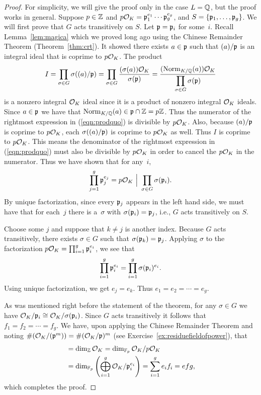 \begin{proof}
	For simplicity, we will give the proof only in the case $L=\mathbb{Q}$, but
	the proof works in general.  Suppose $p\in\mathbb{Z}$ and
	$p\mathcal{O}_K=\mathfrak{p}_1^{e_1}\cdots \mathfrak{p}_g^{e_g}$, and $S=\{\mathfrak{p}_1,\ldots, \mathfrak{p}_g\}$.  We
	will first prove that $G$ acts transitively on $S$.  Let $\mathfrak{p}=\mathfrak{p}_i$ for
	some~$i$.   Recall Lemma~\ref{lem:magica} which we proved long ago using the
	Chinese Remainder Theorem (Theorem~\ref{thm:crt}). It showed there exists
	$a\in\mathfrak{p}$ such that $(a)/\mathfrak{p}$ is an integral ideal that is
	coprime to $p\mathcal{O}_K$.   The product
	\begin{equation}\label{eqn:prodquo}
		I= \prod_{\sigma\in G} \sigma((a)/\mathfrak{p})
		= \prod_{\sigma\in G} \frac{(\sigma(a))\mathcal{O}_K}{\sigma(\mathfrak{p})}
		= \frac{(\operatorname{Norm}_{K/\mathbb{Q}}(a))\mathcal{O}_K}{\displaystyle \prod_{\sigma\in G} \sigma(\mathfrak{p})}
	\end{equation}
	is a nonzero integral $\mathcal{O}_K$ ideal since it is a product of nonzero
	integral $\mathcal{O}_K$ ideals.
	Since $a\in \mathfrak{p}$ we have that
	$\operatorname{Norm}_{K/\mathbb{Q}}(a) \in \mathfrak{p}\cap\mathbb{Z}=p\mathbb{Z}$.  Thus the numerator of
	the rightmost expression in (\ref{eqn:prodquo}) is
	divisible by $p\mathcal{O}_K$.   Also, because $(a)/\mathfrak{p}$ is coprime
	to $p\mathcal{O}_K$, each $\sigma((a)/\mathfrak{p})$ is coprime to $p\mathcal{O}_K$
	as well.   Thus $I$ is coprime to $p\mathcal{O}_K$.   This means the
	denominator of the rightmost expression in (\ref{eqn:prodquo})
	must also be divisible by $p\mathcal{O}_K$ in order to cancel the $p\mathcal{O}_K$
	in the numerator.  Thus we have shown that for any~$i$,
	$$
		\prod_{j=1}^g \mathfrak{p}_j^{e_j}
		= p\mathcal{O}_K \,\,\Big|\,\, \prod_{\sigma\in G} \sigma(\mathfrak{p}_i).
	$$
	By unique factorization, since every $\mathfrak{p}_j$ appears in the left hand
	side, we must have that for each~$j$ there is a~$\sigma$ with
	$\sigma(\mathfrak{p}_i)=\mathfrak{p}_j$, i.e., $G$ acts transitively on $S$.

	Choose some $j$ and suppose that $k\neq j$ is another index.  Because
	$G$ acts transitively, there exists $\sigma\in G$ such that
	$\sigma(\mathfrak{p}_k)=\mathfrak{p}_j$.  Applying $\sigma$ to the factorization $p\mathcal{O}_K =
	\prod_{i=1}^g \mathfrak{p}_i^{e_i}$, we see that
	$$
		\prod_{i=1}^g \mathfrak{p}_i^{e_i} = \prod_{i=1}^g \sigma(\mathfrak{p}_i)^{e_i}.
	$$
	Using unique factorization,
	we get $e_j = e_k$.  Thus $e_1=e_2=\cdots = e_g$.

	As was mentioned right before the statement of the theorem,  for any $\sigma\in G$
	we have $\mathcal{O}_K/\mathfrak{p}_i\cong \mathcal{O}_K/\sigma(\mathfrak{p}_i)$. Since $G$ acts transitively
	it follows that $f_1=f_2=\cdots = f_g$.
	We have, upon applying the Chinese Remainder Theorem
	and noting $\#(\mathcal{O}_K/(\mathfrak{p}^m)) = \#(\mathcal{O}_K/\mathfrak{p})^m$
	(see Exercise~\ref{ex:residuefieldofpower}), that
	\begin{align*}
		[K:\Q]&= \dim_{\Z} \O_K = \dim_{\F_p} \O_K/p\O_K \\
		&= \dim_{\F_p} \left(\bigoplus_{i=1}^g \O_K/\p_i^{e_i}\right)
		= \sum_{i=1}^g e_i f_i
		= efg,
	\end{align*}
	which completes the proof.
\end{proof}

